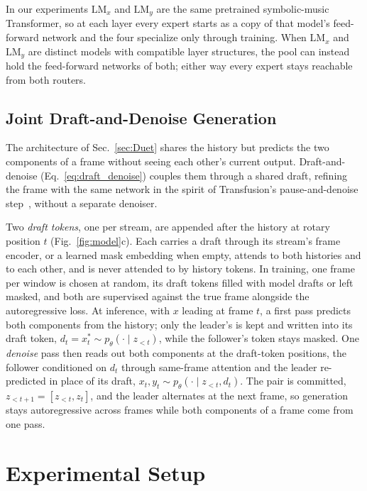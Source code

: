 \documentclass{article}
\begin{document}
In our experiments $\mathrm{LM}_x$ and $\mathrm{LM}_y$ are the same
pretrained symbolic-music Transformer, so at each layer every expert
starts as a copy of that model's feed-forward network and the four
specialize only through training. When $\mathrm{LM}_x$ and
$\mathrm{LM}_y$ are distinct models with compatible layer structures,
the pool can instead hold the feed-forward networks of both; either
way every expert stays reachable from both routers.

\subsection{Joint Draft-and-Denoise Generation}
\label{sec:generation}

The architecture of Sec.~\ref{sec:Duet} shares the history but
predicts the two components of a frame without seeing each other's
current output. Draft-and-denoise (Eq.~\eqref{eq:draft_denoise})
couples them through a shared draft, refining the frame with the same
network in the spirit of Transfusion's pause-and-denoise
step~\cite{transfusion}, without a separate denoiser.

Two \emph{draft tokens}, one per stream, are appended after the
history at rotary position $t$ (Fig.~\ref{fig:model}c). Each carries a
draft through its stream's frame encoder, or a learned mask embedding
when empty, attends to both histories and to each other, and is never
attended to by history tokens. In training, one frame per window is
chosen at random, its draft tokens filled with model drafts or left
masked, and both are supervised against the true frame alongside the
autoregressive loss. At inference, with $x$ leading at frame $t$, a
first pass predicts both components from the history; only the
leader's is kept and written into its draft token,
$d_t = x^*_t \sim p_\theta(\cdot \mid z_{<t})$, while the follower's
token stays masked. One \emph{denoise} pass then reads out both
components at the draft-token positions, the follower conditioned on
$d_t$ through same-frame attention and the leader re-predicted in place
of its draft, $x_t, y_t \sim p_\theta(\cdot \mid z_{<t}, d_t)$. The
pair is committed, $z_{<t+1} = [z_{<t}, z_t]$, and the leader
alternates at the next frame, so generation stays autoregressive
across frames while both components of a frame come from one pass.

\section{Experimental Setup}
\label{sec:setup_exp}
\end{document}
